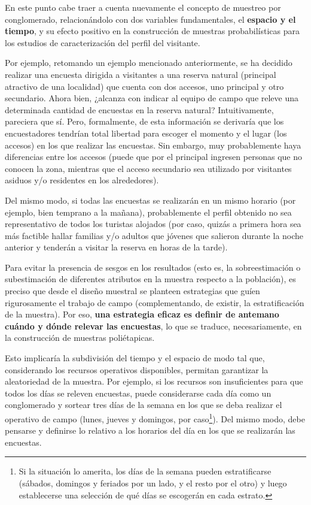 \documentclass[
]{book}
\begin{document}
En este punto cabe traer a cuenta nuevamente el concepto de muestreo por conglomerado, relacionándolo con dos variables fundamentales, el \textbf{espacio y el tiempo}, y su efecto positivo en la construcción de muestras probabilísticas para los estudios de caracterización del perfil del visitante.

Por ejemplo, retomando un ejemplo mencionado anteriormente, se ha decidido realizar una encuesta dirigida a visitantes a una reserva natural (principal atractivo de una localidad) que cuenta con dos accesos, uno principal y otro secundario. Ahora bien, ¿alcanza con indicar al equipo de campo que releve una determinada cantidad de encuestas en la reserva natural? Intuitivamente, pareciera que sí. Pero, formalmente, de esta información se derivaría que los encuestadores tendrían total libertad para escoger el momento y el lugar (los accesos) en los que realizar las encuestas. Sin embargo, muy probablemente haya diferencias entre los accesos (puede que por el principal ingresen personas que no conocen la zona, mientras que el acceso secundario sea utilizado por visitantes asiduos y/o residentes en los alrededores).

Del mismo modo, si todas las encuestas se realizarán en un mismo horario (por ejemplo, bien temprano a la mañana), probablemente el perfil obtenido no sea representativo de todos los turistas alojados (por caso, quizás a primera hora sea más factible hallar familias y/o adultos que jóvenes que salieron durante la noche anterior y tenderán a visitar la reserva en horas de la tarde).

Para evitar la presencia de sesgos en los resultados (esto es, la sobreestimación o subestimación de diferentes atributos en la muestra respecto a la población), es preciso que desde el diseño muestral se planteen estrategias que guíen rigurosamente el trabajo de campo (complementando, de existir, la estratificación de la muestra). Por eso, \textbf{una estrategia eficaz es definir de antemano cuándo y dónde relevar las encuestas}, lo que se traduce, necesariamente, en la construcción de muestras poliétapicas.

Esto implicaría la subdivisión del tiempo y el espacio de modo tal que, considerando los recursos operativos disponibles, permitan garantizar la aleatoriedad de la muestra. Por ejemplo, si los recursos son insuficientes para que todos los días se releven encuestas, puede considerarse cada día como un conglomerado y sortear tres días de la semana en los que se deba realizar el operativo de campo (lunes, jueves y domingos, por caso\footnote{Si la situación lo amerita, los días de la semana pueden estratificarse (sábados, domingos y feriados por un lado, y el resto por el otro) y luego establecerse una selección de qué días se escogerán en cada estrato.}). Del mismo modo, debe pensarse y definirse lo relativo a los horarios del día en los que se realizarán las encuestas.
\end{document}
